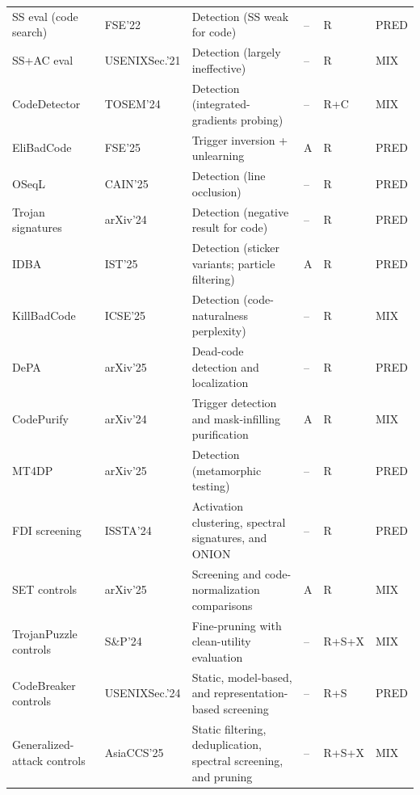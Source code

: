 \documentclass[acmsmall,screen,review,nonacm]{acmart}
\begin{document}
{\begin{longtable}{@{}L{2.50cm} L{1.60cm} L{5.15cm} C{0.70cm} L{1.05cm} C{0.75cm}@{}}
SS eval (code search)~\cite{wan2022yousee} & FSE'22 & Detection (SS weak for code) & -- & R & \textsf{PRED} \\
SS+AC eval~\cite{schuster2021autocomplete} & USENIX\newline Sec.'21 & Detection (largely ineffective) & -- & R & \textsf{MIX} \\
CodeDetector~\cite{li2024codepoisoner} & TOSEM'24 & Detection (integrated-gradients probing) & -- & R+\allowbreak C & \textsf{MIX} \\
EliBadCode~\cite{sun2025elibadcode} & FSE'25 & Trigger inversion + unlearning & A & R & \textsf{PRED} \\
OSeqL~\cite{hussain2025oseql} & CAIN'25 & Detection (line occlusion) & -- & R & \textsf{PRED} \\
Trojan signatures~\cite{hussain2024trojan} & arXiv'24 & Detection (negative result for code) & -- & R & \textsf{PRED} \\
IDBA~\cite{qu2024idba} & IST'25 & Detection (sticker variants; particle filtering) & A & R & \textsf{PRED} \\
KillBadCode~\cite{sun2025killbadcode} & ICSE'25 & Detection (code-naturalness perplexity) & -- & R & \textsf{MIX} \\
DePA~\cite{depa2025} & arXiv'25 & Dead-code detection and localization & -- & R & \textsf{PRED} \\
CodePurify~\cite{mu2024codepurify} & arXiv'24 & Trigger detection and mask-infilling purification & A & R & \textsf{MIX} \\
MT4DP~\cite{mt4dp2025} & arXiv'25 & Detection (metamorphic testing) & -- & R & \textsf{PRED} \\
FDI screening~\cite{wu2024fdi} & ISSTA'24 & Activation clustering, spectral signatures, and ONION & -- & R & \textsf{PRED} \\
SET controls~\cite{ye2025set} & arXiv'25 & Screening and code-normalization comparisons & A & R & \textsf{MIX} \\
TrojanPuzzle controls~\cite{aghakhani2024trojanpuzzle} & S\&P'24 & Fine-pruning with clean-utility evaluation & -- & R+\allowbreak S+\allowbreak X & \textsf{MIX} \\
CodeBreaker controls~\cite{yan2024codebreaker} & USENIX\newline Sec.'24 & Static, model-based, and representation-based screening & -- & R+\allowbreak S & \textsf{PRED} \\
Generalized-attack controls~\cite{rubel2025generalized} & AsiaCCS'25 & Static filtering, deduplication, spectral screening, and pruning & -- & R+\allowbreak S+\allowbreak X & \textsf{MIX} \\

\end{longtable}}
\end{document}
